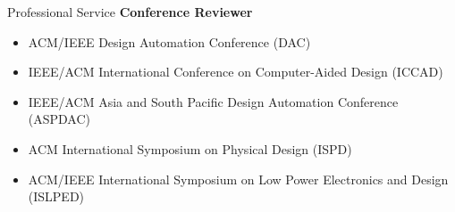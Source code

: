 \begin{rSection}{Professional Service}
\textbf{Conference Reviewer}
\begin{itemize}
    \item ACM/IEEE Design Automation Conference (DAC)
    \item IEEE/ACM International Conference on Computer-Aided Design (ICCAD)
    \item IEEE/ACM Asia and South Pacific Design Automation Conference (ASPDAC)
    \item ACM International Symposium on Physical Design (ISPD)
    \item ACM/IEEE International Symposium on Low Power Electronics and Design (ISLPED)
\end{itemize}
\end{rSection}


